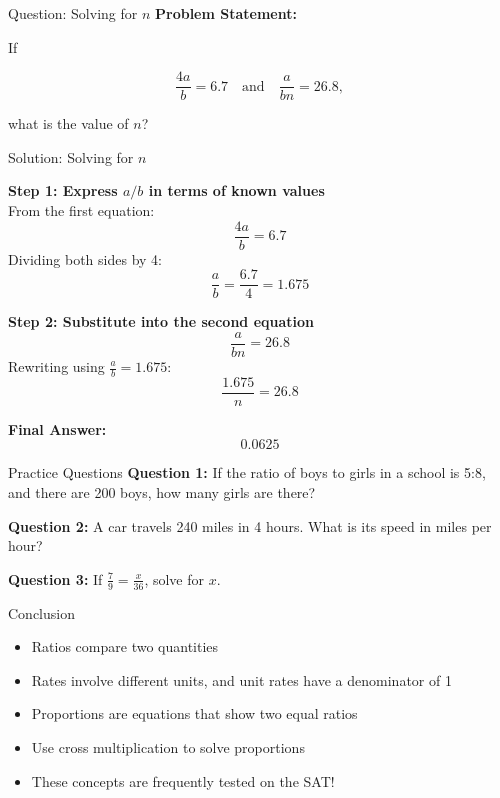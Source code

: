 \documentclass{beamer}
\begin{document}
\begin{frame}{Question: Solving for \( n \)}
\textbf{Problem Statement:} 

If 

\[
\frac{4a}{b} = 6.7 \quad \text{and} \quad \frac{a}{bn} = 26.8,
\]

what is the value of \( n \)?

\end{frame}

\begin{frame}{Solution: Solving for \( n \)}

\textbf{Step 1: Express \( a/b \) in terms of known values} \\
From the first equation:
\[
\frac{4a}{b} = 6.7
\]
Dividing both sides by 4:
\[
\frac{a}{b} = \frac{6.7}{4} = 1.675
\]

\textbf{Step 2: Substitute into the second equation} \\
\[
\frac{a}{bn} = 26.8
\]
Rewriting using \( \frac{a}{b} = 1.675 \):
\[
\frac{1.675}{n} = 26.8
\]



\textbf{Final Answer:} \\
\[
\boxed{0.0625}
\]

\end{frame}





\begin{frame}{Practice Questions}
    \textbf{Question 1:} If the ratio of boys to girls in a school is 5:8, and there are 200 boys, how many girls are there?

    \textbf{Question 2:} A car travels 240 miles in 4 hours. What is its speed in miles per hour?

    \textbf{Question 3:} If \( \frac{7}{9} = \frac{x}{36} \), solve for \( x \).
\end{frame}

\begin{frame}{Conclusion}
    \begin{itemize}
        \item Ratios compare two quantities
        \item Rates involve different units, and unit rates have a denominator of 1
        \item Proportions are equations that show two equal ratios
        \item Use cross multiplication to solve proportions
        \item These concepts are frequently tested on the SAT!
    \end{itemize}
\end{frame}
\end{document}
